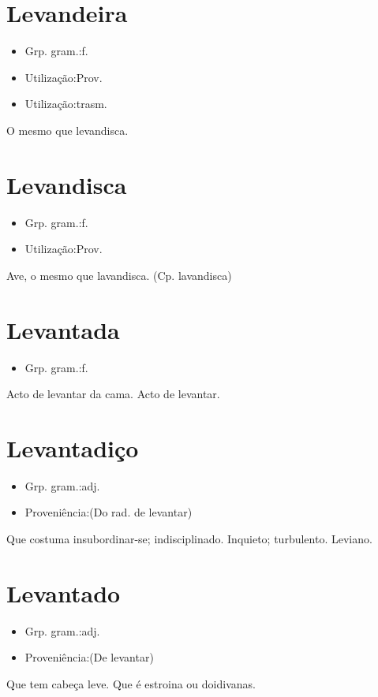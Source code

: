\section{Levandeira}
\begin{itemize}
\item {Grp. gram.:f.}
\end{itemize}
\begin{itemize}
\item {Utilização:Prov.}
\end{itemize}
\begin{itemize}
\item {Utilização:trasm.}
\end{itemize}
O mesmo que \textunderscore levandisca\textunderscore .
\section{Levandisca}
\begin{itemize}
\item {Grp. gram.:f.}
\end{itemize}
\begin{itemize}
\item {Utilização:Prov.}
\end{itemize}
Ave, o mesmo que \textunderscore lavandisca\textunderscore .
(Cp. \textunderscore lavandisca\textunderscore )
\section{Levantada}
\begin{itemize}
\item {Grp. gram.:f.}
\end{itemize}
Acto de levantar da cama.
Acto de levantar.
\section{Levantadiço}
\begin{itemize}
\item {Grp. gram.:adj.}
\end{itemize}
\begin{itemize}
\item {Proveniência:(Do rad. de \textunderscore levantar\textunderscore )}
\end{itemize}
Que costuma insubordinar-se; indisciplinado.
Inquieto; turbulento.
Leviano.
\section{Levantado}
\begin{itemize}
\item {Grp. gram.:adj.}
\end{itemize}
\begin{itemize}
\item {Proveniência:(De \textunderscore levantar\textunderscore )}
\end{itemize}
Que tem cabeça leve.
Que é estroina ou doidivanas.
